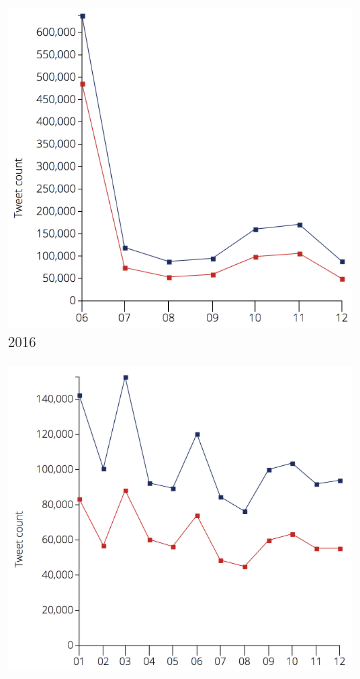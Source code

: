 \documentclass[11pt]{report}
\begin{document}
\begin{figure}[H]
        \begin{subfigure}[b]{0.33\textwidth}
                \includegraphics[width=\linewidth]{images/2016-naive.png}
                \caption{2016}
                \label{fig:gull}
        \end{subfigure}%
        \begin{subfigure}[b]{0.33\textwidth}
                \includegraphics[width=\linewidth]{images/2017-naive.png}

\end{subfigure}
\end{figure}
\end{document}
